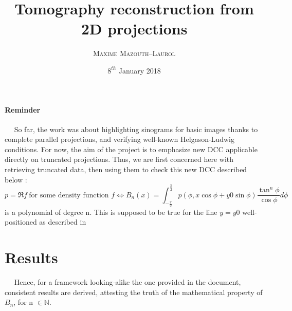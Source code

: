 \documentclass[a4,12pt]{article}
\title{\textbf{Tomography reconstruction from 2D projections}}
\author{
\begin{tabular}{cc}
	\textsc{Maxime Mazouth--Laurol}
\end{tabular}}
\date{\small $8^{th}$ January 2018}
\begin{document}
\maketitle
\paragraph{Reminder}
~~ So far, the work was about highlighting sinograms for basic  images thanks to complete parallel projections, and verifying well-known Helgason-Ludwig conditions. For now, the aim of the project is to emphasize new DCC applicable directly on truncated projections. Thus, we are first concerned here with retrieving truncated data, then using them to check this new DCC described below : \\
\[
p = \Re f ~ \text{for some density function }f \Leftrightarrow B_{n}(x) = \int_{-\frac{\pi}{2}}^{\frac{\pi}{2}}p(\phi,x\cos\phi + y0\sin\phi)\frac{\tan^{n}\phi}{\cos\phi}d\phi
\] is a polynomial of degree n. This is supposed to be true for the line $y=y0$ well-positioned as described in\cite{truncProj}

\section{Results}
~~ Hence, for a framework looking-alike the one provided in the document, consistent results are derived, attesting the truth of the mathematical property of $B_n$, for n $\in \mathbb{N}$.
\end{document}
